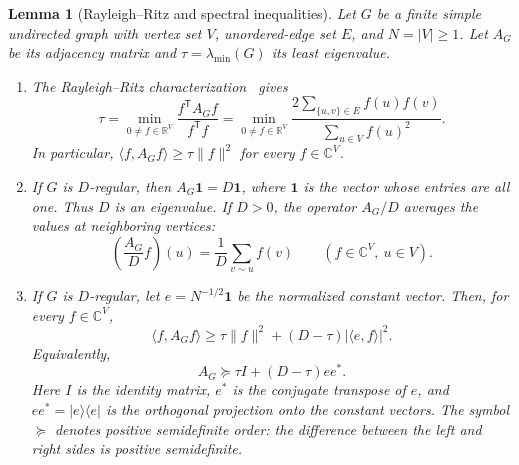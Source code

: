 \documentclass[11pt,a4paper]{article}
\numberwithin{equation}{section}
\numberwithin{figure}{section}
\numberwithin{table}{section}
\numberwithin{footnote}{section}
\newtheorem{lemma}[theorem]{Lemma}
\theoremstyle{informal}\newtheorem*{informaltheorem}{Informal theorem}
\theoremstyle{definition}\newtheorem{example}{Example}[section]
\theoremstyle{remark}\newtheorem{remark}[theorem]{Remark}
\newcommand{\C}{\mathbb C}
\newcommand{\one}{\mathbf 1}
\begin{document}
\begin{lemma}[Rayleigh--Ritz and spectral inequalities]
\label{lem:regular-spectral-inequality}
Let \(G\) be a finite simple undirected graph with vertex set \(V\),
unordered-edge set \(E\), and \(N=|V|\geq1\). Let \(A_G\) be its
adjacency matrix and \(\tau=\lambda_{\min}(G)\) its least eigenvalue.
\begin{enumerate}[label=\textup{(\roman*)},leftmargin=*,itemsep=4pt]
\item\label{item:rayleigh-ritz}
The Rayleigh--Ritz characterization~\cite[Sec.~2.4]{bh} gives
\begin{equation}\label{eq:rayleigh-ritz}
 \tau
 =\min_{0\ne f\in\mathbb R^V}
   \frac{f^{\mathsf T}A_Gf}{f^{\mathsf T}f}
 =\min_{0\ne f\in\mathbb R^V}
   \frac{2\sum_{\{u,v\}\in E}f(u)f(v)}{\sum_{u\in V}f(u)^2}.
\end{equation}
In particular, \(\langle f,A_Gf\rangle\geq\tau\|f\|^2\)
for every \(f\in\C^V\).

\item\label{item:regular-neighbor-average}
If \(G\) is \(D\)-regular, then \(A_G\one=D\one\), where
\(\one\) is the vector whose entries are all one. Thus \(D\)
is an eigenvalue. If \(D>0\), the operator \(A_G/D\) averages
the values at neighboring vertices:
\begin{equation}\label{eq:neighbor-average}
 \left(\frac{A_G}{D}f\right)(u)
 =\frac1D\sum_{v\sim u}f(v)
 \qquad(f\in\C^V,\ u\in V).
\end{equation}

\item\label{item:regular-spectral-bound}
If \(G\) is \(D\)-regular, let \(e=N^{-1/2}\one\) be the
normalized constant vector. Then, for every \(f\in\C^V\),
\begin{equation}\label{eq:regular-spectral-quadratic}
 \langle f,A_Gf\rangle
 \geq\tau\|f\|^2+(D-\tau)|\langle e,f\rangle|^2.
\end{equation}
Equivalently,
\begin{equation}\label{eq:regular-spectral-operator}
 A_G\succeq\tau I+(D-\tau)ee^*.
\end{equation}
Here \(I\) is the identity matrix, \(e^*\) is the conjugate transpose
of \(e\), and \(ee^*=|e\rangle\langle e|\) is the orthogonal
projection onto the constant vectors. The symbol \(\succeq\)
denotes positive semidefinite order: the difference between the
left and right sides is positive semidefinite.
\end{enumerate}
\end{lemma}
\end{document}
